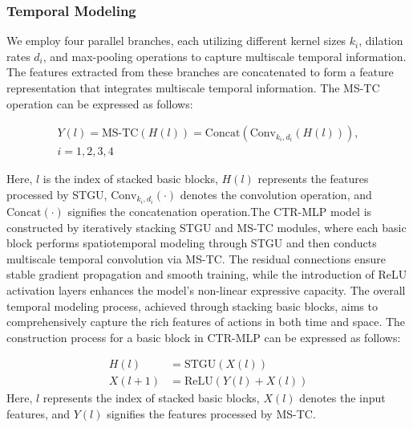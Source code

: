 \documentclass[conference,a4paper,english]{IEEEtran}[2015/08/26]
\begin{document}
\subsubsection{Temporal Modeling}
We employ four parallel branches, each utilizing different kernel sizes \(k_i\), 
dilation rates \(d_i\), and max-pooling operations to capture multiscale temporal information. 
The features extracted from these branches are concatenated to form a feature representation 
that integrates multiscale temporal information. The MS-TC operation can be expressed as follows:

\begin{align*}
  Y(l) = \text{MS-TC}(H(l)) = \text{Concat}(\text{Conv}_{k_i, d_i}(H(l)))\tag{17} , \\i = 1,2,3,4
\end{align*}
 
  Here, \(l\) is the index of stacked basic blocks, \(H(l)\) represents the features 
  processed by STGU, \(\text{Conv}_{k_i, d_i}(\cdot)\) denotes the convolution operation, 
  and \(\text{Concat}(\cdot)\) signifies the concatenation operation.The CTR-MLP model is constructed by iteratively stacking STGU and MS-TC modules, 
  where each basic block performs spatiotemporal modeling through STGU and then conducts 
  multiscale temporal convolution via MS-TC. The residual connections ensure stable gradient 
  propagation and smooth training, while the introduction of ReLU activation layers enhances 
  the model's non-linear expressive capacity. The overall temporal modeling process, 
  achieved through stacking basic blocks, aims to comprehensively capture the rich features 
  of actions in both time and space. The construction process for a basic block in CTR-MLP 
  can be expressed as follows:
  
\begin{align*}
  H(l) &= \text{STGU}(X(l))\tag{18} \\
  X(l+1) &= \text{ReLU}(Y(l) + X(l))\tag{19}
  \end{align*}
  Here, \(l\) represents the index of stacked basic blocks, \(X(l)\) denotes the input features, and \(Y(l)\) signifies the features processed by MS-TC.
  
\end{document}
